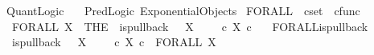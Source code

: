 %
\begin{isabellebody}%
%
%
\isadelimdocument
%
\endisadelimdocument
%
\isatagdocument
%
\isamarkuptrue%
%
\endisatagdocument
{\isafolddocument}%
%
\isadelimdocument
%
\endisadelimdocument
%
\isadelimtheory
%
\endisadelimtheory
%
\isatagtheory
{}\isamarkupfalse%
\ Quant{\isacharunderscore}{\kern0pt}Logic\isanewline
\ \ \ Pred{\isacharunderscore}{\kern0pt}Logic\ Exponential{\isacharunderscore}{\kern0pt}Objects\isanewline
{}%
\endisatagtheory
{\isafoldtheory}%
%
\isadelimtheory
%
\endisadelimtheory
%
\isadelimdocument
%
\endisadelimdocument
%
\isatagdocument
%
\isamarkuptrue%
%
\endisatagdocument
{\isafolddocument}%
%
\isadelimdocument
%
\endisadelimdocument
{}\isamarkupfalse%
\ FORALL\ {\isacharcolon}{\kern0pt}{\isacharcolon}{\kern0pt}\ {\isachardoublequoteopen}cset\ {\isasymRightarrow}\ cfunc{\isachardoublequoteclose}\ \isanewline
\ \ {\isachardoublequoteopen}FORALL\ X\ {\isacharequal}{\kern0pt}\ {\isacharparenleft}{\kern0pt}THE\ {\isasymchi}{\isachardot}{\kern0pt}\ is{\isacharunderscore}{\kern0pt}pullback\ {\isasymone}\ {\isasymone}\ {\isacharparenleft}{\kern0pt}{\isasymOmega}\isactrlbsup X\isactrlesup {\isacharparenright}{\kern0pt}\ {\isasymOmega}\ {\isacharparenleft}{\kern0pt}{\isasymbeta}\isactrlbsub {\isasymone}\isactrlesub {\isacharparenright}{\kern0pt}\ {\isasymt}\ {\isacharparenleft}{\kern0pt}{\isacharparenleft}{\kern0pt}{\isasymt}\ {\isasymcirc}\isactrlsub c\ {\isasymbeta}\isactrlbsub X\ {\isasymtimes}\isactrlsub c\ {\isasymone}\isactrlesub {\isacharparenright}{\kern0pt}\isactrlsup {\isasymsharp}{\isacharparenright}{\kern0pt}\ {\isasymchi}{\isacharparenright}{\kern0pt}{\isachardoublequoteclose}\isanewline
\isanewline
{}\isamarkupfalse%
\ FORALL{\isacharunderscore}{\kern0pt}is{\isacharunderscore}{\kern0pt}pullback{\isacharcolon}{\kern0pt}\isanewline
\ \ {\isachardoublequoteopen}is{\isacharunderscore}{\kern0pt}pullback\ {\isasymone}\ {\isasymone}\ {\isacharparenleft}{\kern0pt}{\isasymOmega}\isactrlbsup X\isactrlesup {\isacharparenright}{\kern0pt}\ {\isasymOmega}\ {\isacharparenleft}{\kern0pt}{\isasymbeta}\isactrlbsub {\isasymone}\isactrlesub {\isacharparenright}{\kern0pt}\ {\isasymt}\ {\isacharparenleft}{\kern0pt}{\isacharparenleft}{\kern0pt}{\isasymt}\ {\isasymcirc}\isactrlsub c\ {\isasymbeta}\isactrlbsub X\ {\isasymtimes}\isactrlsub c\ {\isasymone}\isactrlesub {\isacharparenright}{\kern0pt}\isactrlsup {\isasymsharp}{\isacharparenright}{\kern0pt}\ {\isacharparenleft}{\kern0pt}FORALL\ X{\isacharparenright}{\kern0pt}{\isachardoublequoteclose}\isanewline

\end{isabellebody}
